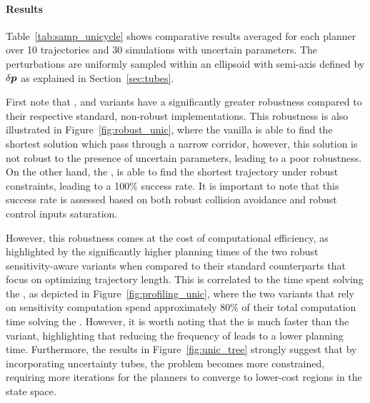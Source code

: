 \paragraph{Results}



Table~\ref{tab:samp_unicycle} shows comparative results averaged for each planner over 10 trajectories and 30 simulations with uncertain parameters. 
The perturbations are uniformly sampled within an ellipsoid with semi-axis defined by $\delta \boldsymbol{p}$ as explained in Section~\ref{sec:tubes}.

First note that , and  variants have a significantly greater robustness compared to their respective standard, non-robust implementations.
This robustness is also illustrated in Figure~\ref{fig:robust_unic}, where the vanilla  is able to find the shortest solution which pass through a narrow corridor, however, this solution is not robust to the presence of uncertain parameters, leading to a poor robustness.
On the other hand, the , is able to find the shortest trajectory under robust constraints, leading to a 100\% success rate.
It is important to note that this success rate is assessed based on both robust collision avoidance and robust control inputs saturation.

However, this robustness comes at the cost of computational efficiency, as highlighted by the significantly higher planning times of the two robust sensitivity-aware variants when compared to their standard counterparts that focus on optimizing trajectory length.
This is correlated to the time spent solving the , as depicted in Figure~\ref{fig:profiling_unic}, where the two variants that rely on sensitivity computation spend approximately 80\% of their total computation time solving the . 
However, it is worth noting that the  is much faster than the  variant, highlighting that reducing the frequency of  leads to a lower planning time.
Furthermore, the results in Figure~\ref{fig:unic_tree} strongly suggest that by incorporating uncertainty tubes, the problem becomes more constrained, requiring more iterations for the planners to converge to lower-cost regions in the state space.


